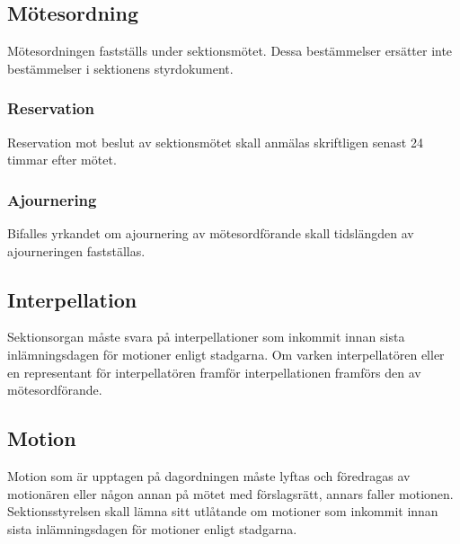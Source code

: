 \subsection{Mötesordning}
Mötesordningen fastställs under sektionsmötet. Dessa bestämmelser ersätter inte bestämmelser i sektionens styrdokument.

\subsubsection{Reservation}
Reservation mot beslut av sektionsmötet skall anmälas skriftligen senast 24 timmar efter mötet.

\subsubsection{Ajournering}
Bifalles yrkandet om ajournering av mötesordförande skall tidslängden av ajourneringen fastställas.

\subsection{Interpellation}
Sektionsorgan måste svara på interpellationer som inkommit innan sista inlämningsdagen för motioner enligt stadgarna. Om varken interpellatören eller en representant för interpellatören framför interpellationen framförs den av mötesordförande.

\subsection{Motion}
Motion som är upptagen på dagordningen måste lyftas och föredragas av motionären eller någon annan på mötet med förslagsrätt, annars faller motionen. Sektionsstyrelsen skall lämna sitt utlåtande om motioner som inkommit innan sista inlämningsdagen för motioner enligt stadgarna.
